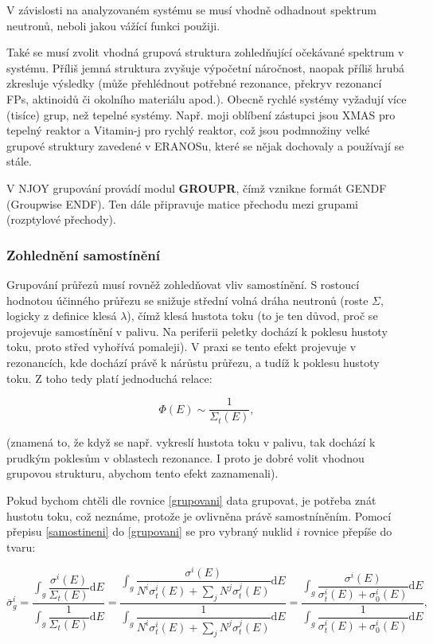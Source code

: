 V závislosti na analyzovaném systému se musí vhodně odhadnout spektrum neutronů, neboli jakou vážící funkci použiji.

Také se musí zvolit vhodná grupová struktura zohledňující očekávané spektrum v systému. Příliš jemná struktura zvyšuje výpočetní náročnost, naopak příliš hrubá zkresluje výsledky (může přehlédnout potřebné rezonance, překryv rezonancí FPs, aktinoidů či okolního materiálu apod.). Obecně rychlé systémy vyžadují více (tisíce) grup, než tepelné systémy. Např. moji oblíbení zástupci jsou XMAS pro tepelný reaktor a Vitamin-j pro rychlý reaktor, což jsou podmnožiny velké grupové struktury zavedené v ERANOSu, které se nějak dochovaly a používají se stále.

V NJOY grupování provádí modul \textbf{GROUPR}, čímž vznikne formát GENDF (Groupwise ENDF). Ten dále připravuje matice přechodu mezi grupami (rozptylové přechody).

\subsubsection{Zohlednění samostínění}

Grupování průřezů musí rovněž zohledňovat vliv samostínění. S rostoucí hodnotou účinného průřezu se snižuje střední volná dráha neutronů (roste $\Sigma$, logicky z definice klesá $\lambda$), čímž klesá hustota toku (to je ten důvod, proč se projevuje samostínění v palivu. Na periferii peletky dochází k poklesu hustoty toku, proto střed vyhořívá pomaleji). V praxi se tento efekt projevuje v rezonancích, kde dochází právě k nárůstu průřezu, a tudíž k poklesu hustoty toku. Z toho tedy platí jednoduchá relace:

\begin{equation}
  \boxed{
    \Phi(E) \sim \dfrac{1}{\Sigma_t(E)},}
    \label{samostineni}
\end{equation}

\noindent (znamená to, že když se např. vykreslí hustota toku v palivu, tak dochází k prudkým poklesům v oblastech rezonance. I proto je dobré volit vhodnou grupovou strukturu, abychom tento efekt zaznamenali).

Pokud bychom chtěli dle rovnice \eqref{grupovani} data grupovat, je potřeba znát hustotu toku, což neznáme, protože je ovlivněna právě samostníněním. Pomocí přepisu \eqref{samostineni} do \eqref{grupovani} se pro vybraný nuklid $i$ rovnice přepíše do tvaru:

$$ \bar{\sigma}_g^i = \dfrac{\int_g \dfrac{\sigma^i(E)}{\Sigma_t(E)} \text{d}E}{\int_g \dfrac{1}{\Sigma_t(E)} \text{d}E} = \dfrac{\int_g \dfrac{\sigma^i(E)}{N^i \sigma_t^i(E) + \sum_j N^j \sigma_t^j(E)} \text{d}E}{\int_g \dfrac{1}{N^i \sigma_t^i(E) + \sum_j N^j \sigma_t^j(E)} \text{d}E} = \dfrac{\int_g \dfrac{\sigma^i(E)}{\sigma_t^i(E) + \sigma_0^i(E)} \text{d}E}{\int_g \dfrac{1}{\sigma_t^i(E) + \sigma_0^i(E)} \text{d}E},$$

